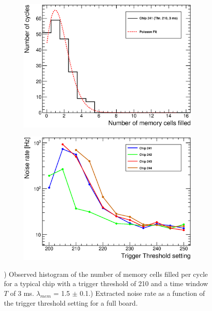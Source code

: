 \begin{figure}[htbp!]
  \centering
  \begin{subfigure}[t]{0.49\textwidth}
    \includegraphics[width=1.\linewidth]{../Thesis_Plots/Commissioning/Plots/NumberMemFilled_Poisson.eps}
    \caption{} \label{fig:MemPoison}
  \end{subfigure}
  \hfill
  \begin{subfigure}[t]{0.49\textwidth}
    \includegraphics[width=1.\linewidth]{../Thesis_Plots/Commissioning/Plots/NoiseMeasurement_SM1.eps}
    \caption{} \label{fig:DCRThr}
  \end{subfigure}
  \caption{) Observed histogram of the number of memory cells filled per cycle for a typical chip with a trigger threshold of 210 and a time window $T$ of 3 ms. $\lambda_{mem}$ = 1.5 $\pm$ 0.1.) Extracted noise rate as a function of the trigger threshold setting for a full board.}
\end{figure}

